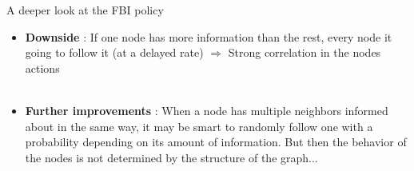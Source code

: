 \documentclass{beamer}
\begin{document}
\begin{frame}{A deeper look at the FBI policy}
\begin{itemize}
\item \textbf{Downside} : If one node has more information than the rest, every node it going to follow it (at a delayed rate) $\Rightarrow$ \alert{Strong correlation in the nodes actions} \\ ~ \\


\item \textbf{Further improvements} : When a node has multiple neighbors informed about in the same way, it may be smart to randomly follow one with a \alert{probability depending on its amount of information}. But then the behavior of the nodes is not determined by the structure of the graph...
\end{itemize}
\end{frame}
\end{document}
